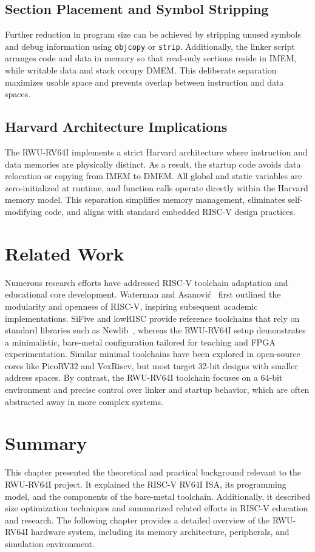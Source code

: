 \subsection{Section Placement and Symbol Stripping}
Further reduction in program size can be achieved by stripping unused symbols and debug information using \texttt{objcopy} or \texttt{strip}.  
Additionally, the linker script arranges code and data in memory so that read-only sections reside in IMEM, while writable data and stack occupy DMEM.  
This deliberate separation maximizes usable space and prevents overlap between instruction and data spaces.

\subsection{Harvard Architecture Implications}
The RWU-RV64I implements a strict Harvard architecture where instruction and data memories are physically distinct.  
As a result, the startup code avoids data relocation or copying from IMEM to DMEM.  
All global and static variables are zero-initialized at runtime, and function calls operate directly within the Harvard memory model.  
This separation simplifies memory management, eliminates self-modifying code, and aligns with standard embedded RISC-V design practices.

\section{Related Work}
Numerous research efforts have addressed RISC-V toolchain adaptation and educational core development.  
Waterman and Asanović~\cite{riscv-spec} first outlined the modularity and openness of RISC-V, inspiring subsequent academic implementations.  
SiFive and lowRISC provide reference toolchains that rely on standard libraries such as Newlib~\cite{sifive-toolchain}, whereas the RWU-RV64I setup demonstrates a minimalistic, bare-metal configuration tailored for teaching and FPGA experimentation.  
Similar minimal toolchains have been explored in open-source cores like PicoRV32 and VexRiscv, but most target 32-bit designs with smaller address spaces.  
By contrast, the RWU-RV64I toolchain focuses on a 64-bit environment and precise control over linker and startup behavior, which are often abstracted away in more complex systems.

\section{Summary}
This chapter presented the theoretical and practical background relevant to the RWU-RV64I project.  
It explained the RISC-V RV64I ISA, its programming model, and the components of the bare-metal toolchain.  
Additionally, it described size optimization techniques and summarized related efforts in RISC-V education and research.  
The following chapter provides a detailed overview of the RWU-RV64I hardware system, including its memory architecture, peripherals, and simulation environment.
